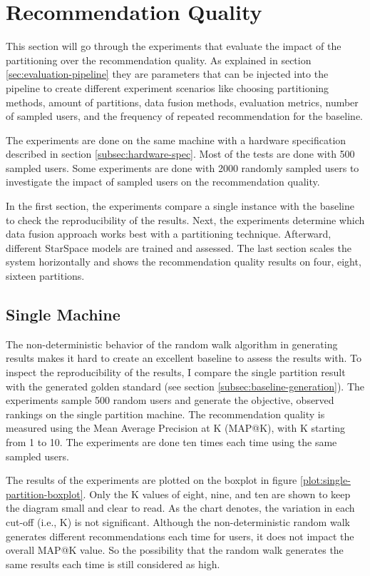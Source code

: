 \section{Recommendation Quality}
\label{sec:recommendation-quality}
This section will go through the experiments that evaluate the impact of the partitioning over the recommendation quality. As explained in section \ref{sec:evaluation-pipeline} they are parameters that can be injected into the pipeline to create different experiment scenarios like choosing partitioning methods, amount of partitions, data fusion methods, evaluation metrics, number of sampled users, and the frequency of repeated recommendation for the baseline.


The experiments are done on the same machine with a hardware specification described in section \ref{subsec:hardware-spec}. Most of the tests are done with 500 sampled users. Some experiments are done with 2000 randomly sampled users to investigate the impact of sampled users on the recommendation quality.


In the first section, the experiments compare a single instance with the baseline to check the reproducibility of the results. Next, the experiments determine which data fusion approach works best with a partitioning technique. Afterward, different StarSpace models are trained and assessed. The last section scales the system horizontally and shows the recommendation quality results on four, eight, sixteen partitions. 


\subsection{Single Machine}
\label{subsec:eval-single-machine}
The non-deterministic behavior of the random walk algorithm in generating results makes it hard to create an excellent baseline to assess the results with. To inspect the reproducibility of the results, I compare the single partition result with the generated golden standard (see section \ref{subsec:baseline-generation}). The experiments sample 500 random users and generate the objective, observed rankings on the single partition machine. The recommendation quality is measured using the Mean Average Precision at K (MAP@K), with K starting from 1 to 10. The experiments are done ten times each time using the same sampled users. 

The results of the experiments are plotted on the boxplot in figure \ref{plot:single-partition-boxplot}. Only the K values of eight, nine, and ten are shown to keep the diagram small and clear to read. As the chart denotes, the variation in each cut-off (i.e., K) is not significant. Although the non-deterministic random walk generates different recommendations each time for users, it does not impact the overall MAP@K value. So the possibility that the random walk generates the same results each time is still considered as high.



